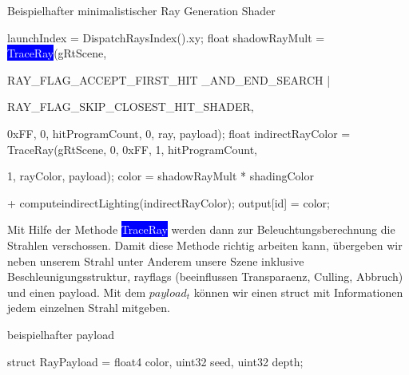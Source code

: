 \begin{tcolorbox}
\begin{algorithm}[H]
    \caption{Beispielhafter minimalistischer Ray Generation Shader}
    \begin{algorithmic}[1]
        \State launchIndex = DispatchRaysIndex().xy;
            \State float shadowRayMult = \colorbox{blue}{\textcolor{white}{TraceRay}}(gRtScene,\par
            RAY\_FLAG\_ACCEPT\_FIRST\_HIT \_AND\_END\_SEARCH |\par
            RAY\_FLAG\_SKIP\_CLOSEST\_HIT\_SHADER,\par
            0xFF, 0, hitProgramCount, 0, ray, payload);
            \State float indirectRayColor = TraceRay(gRtScene, 0, 0xFF, 1, hitProgramCount,\par
            1, rayColor, payload);
            \State color = shadowRayMult * shadingColor \par
            + computeindirectLighting(indirectRayColor);
        \EndFor
        \State output[id] = color;
    \end{algorithmic}
    \label{alg:Ray Gen}
\end{algorithm}
\end{tcolorbox}

Mit Hilfe der Methode \colorbox{blue}{\textcolor{white}{TraceRay}} werden dann zur Beleuchtungsberechnung 
die Strahlen verschossen. Damit diese Methode richtig arbeiten kann, übergeben wir neben unserem Strahl 
unter Anderem  unsere Szene inklusive Beschleunigungsstruktur, rayflags 
(beeinflussen Transparaenz, Culling, Abbruch)\cite{RayFlags} und einen payload.
Mit dem \textit{$payload_t$} können wir einen struct mit Informationen jedem einzelnen Strahl mitgeben.

\begin{tcolorbox}
\begin{algorithm}[H]
    \caption{beispielhafter payload}
    \begin{algorithmic}[1]
        \State struct RayPayload = {float4 color, uint32 seed, uint32 depth};        
        \end{algorithmic}
        \label{alg:payload}
\end{algorithm}
\end{tcolorbox}
    
